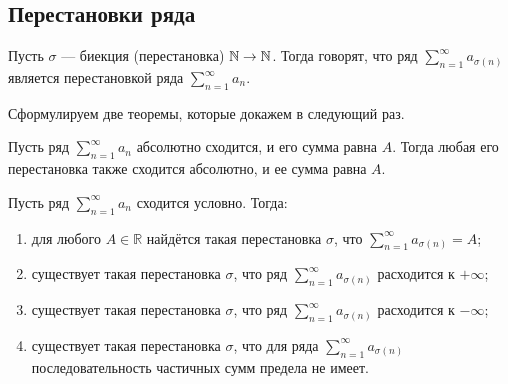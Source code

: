 	\subsection{Перестановки ряда}
	\begin{Def}
		Пусть $\sigma$ --- биекция (перестановка) $\mathbb{N} \to \mathbb{N}$. Тогда говорят, что ряд $\sum\limits_{n=1}^{\infty}a_{\sigma(n)}$ является перестановкой ряда $\sum\limits_{n=1}^{\infty}a_n$.
	\end{Def}
	Сформулируем две теоремы, которые докажем в следующий раз.
	\begin{Theorem}[Коши]
		Пусть ряд $\sum\limits_{n=1}^{\infty}a_n$ абсолютно сходится, и его сумма равна $A$. Тогда любая его перестановка также сходится абсолютно, и ее сумма равна $A$.
	\end{Theorem}
	\begin{Theorem}[Римана]
		Пусть ряд $\sum\limits_{n=1}^{\infty}a_n$ сходится условно. Тогда:
		\begin{enumerate}
			\item для любого $A \in \mathbb{R}$ найдётся такая перестановка $\sigma$, что $\sum\limits_{n=1}^{\infty}a_{\sigma(n)} = A $;
			\item существует такая перестановка $\sigma$, что ряд $\sum\limits_{n=1}^{\infty}a_{\sigma(n)}$ расходится к $+\infty$;
			\item существует такая перестановка $\sigma$, что ряд $\sum\limits_{n=1}^{\infty}a_{\sigma(n)}$ расходится к $-\infty$;
			\item существует такая перестановка $\sigma$, что для ряда $\sum\limits_{n=1}^{\infty}a_{\sigma(n)}$ последовательность частичных сумм предела не имеет.
		\end{enumerate}
	\end{Theorem}
